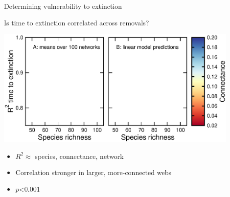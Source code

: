 \documentclass{beamer}
\newcommand*\whitem{%
  \item[\color{white}\scalebox{0.9}{\textbullet}]}
\begin{document}
  \begin{frame}{Determining vulnerability to extinction}

    \begin{block}{Is time to extinction correlated across removals?}

    \vspace{0.2cm}

    \begin{centering}

      \includegraphics[width=0.9\textwidth]{../manuscript/figures/extinction_order/extorder_correlations_talk_axis.eps}
    
      \end{centering}

    \end{block}

    \begin{itemize}
      \item $R^2 \approx$ species, connectance, network
      \whitem {\color{white}Correlation stronger in larger, more-connected webs}
      \whitem {\color{white}$p$\textless0.001}
    \end{itemize}

    \end{frame}




    
    
\end{document}

